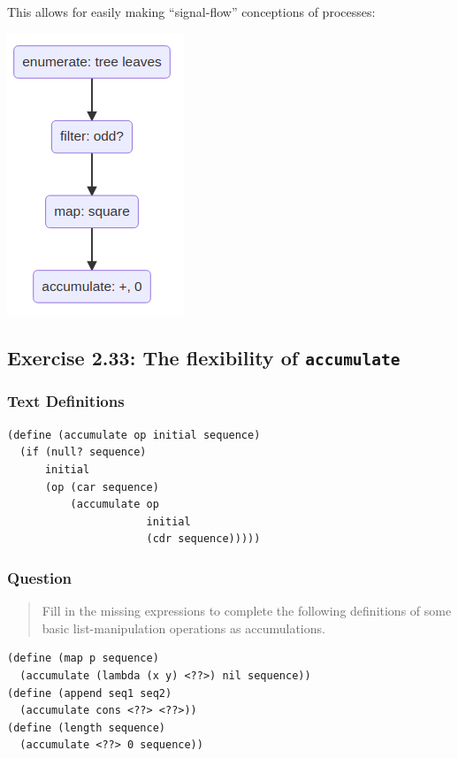 \documentclass[final,fleqn,titlepage,twoside]{article}
\begin{document}
This allows for easily making ``signal-flow'' conceptions of processes:

\begin{center}
\includegraphics[width=0.3\linewidth]{2/fig/t_2-2-3.png}
\end{center}

\subsection{Exercise 2.33: The flexibility of \texttt{accumulate}}
\label{sec:orgaa4512a}
\subsubsection{Text Definitions}
\label{sec:orgf2ae8b6}
\begin{verbatim}
(define (accumulate op initial sequence)
  (if (null? sequence)
      initial
      (op (car sequence)
          (accumulate op 
                      initial 
                      (cdr sequence)))))
\end{verbatim}

\subsubsection{Question}
\label{sec:org29b4bbe}
\begin{quote}
Fill in the missing expressions to complete the following definitions of some basic list-manipulation operations as accumulations.
\end{quote}

\begin{verbatim}
(define (map p sequence)
  (accumulate (lambda (x y) <??>) nil sequence))
(define (append seq1 seq2)
  (accumulate cons <??> <??>))
(define (length sequence)
  (accumulate <??> 0 sequence))
\end{verbatim}
\end{document}
